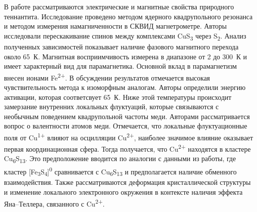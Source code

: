 В работе \cite{Gainov2008} рассматриваются электрические и магнитные свойства природного теннантита. Исследование проведено методом ядерного квадрупольного резонанса и методом измерения намагниченности в СКВИД магнетрометре. Авторы исследовали перескакивание спинов между комплексами CuS\textsubscript{3} через S\textsubscript{2}. Анализ полученных зависимостей показывает наличие фазового магнитного перехода около 65~К. Магнитная восприимчивость измерена в диапазоне от 2 до 300~К и имеет характерный вид для парамагнетика. Основной вклад в парамагнетизм внесен ионами Fe\textsuperscript{2+}. В обсуждении результатов отмечается высокая чувствительность метода к изоморфным аналогам. Авторы определили энергию активации, которая соответсвует 65~К. Ниже этой температуры происходит замерзание внутренних локальных флуктуаций, которые связываются с необычным поведением квадрупольной частоты меди. Авторами рассматривается вопрос о валентности атомов меди. Отмечается, что локальные флуктуационные поля от Cu\textsuperscript{1+} влияют на осцилляции Cu\textsuperscript{2+}, наиболее значимое влияние оказывает первая координационная сфера. Тогда получается, что Cu\textsuperscript{2+} находятся в кластере Cu\textsubscript{6}S\textsubscript{13}. Это предположение вводится по аналогии с данными из работы\cite{Pattrick1993}, где кластер [Fe\textsubscript{3}S\textsubscript{4}]\textsuperscript{0} сравнивается с Cu\textsubscript{6}S\textsubscript{13} и предполагается наличие обменного взаимодействия.  Также рассматриваются деформация кристаллической структуры и изменение локального электронного окружения в контексте наличия эффекта Яна--Теллера, связанного с  Cu\textsuperscript{2+}.

